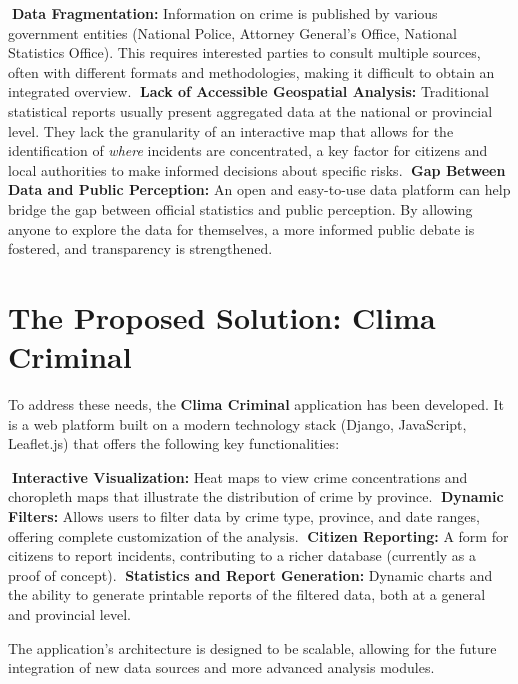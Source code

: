 \documentclass[12pt, a4paper]{article}
\begin{document}
\begin{enumerate}
    \textbf{Data Fragmentation:} Information on crime is published by various government entities (National Police, Attorney General's Office, National Statistics Office). This requires interested parties to consult multiple sources, often with different formats and methodologies, making it difficult to obtain an integrated overview.
    \textbf{Lack of Accessible Geospatial Analysis:} Traditional statistical reports usually present aggregated data at the national or provincial level. They lack the granularity of an interactive map that allows for the identification of \textit{where} incidents are concentrated, a key factor for citizens and local authorities to make informed decisions about specific risks.
    \textbf{Gap Between Data and Public Perception:} An open and easy-to-use data platform can help bridge the gap between official statistics and public perception. By allowing anyone to explore the data for themselves, a more informed public debate is fostered, and transparency is strengthened.
\end{enumerate}

\section{The Proposed Solution: Clima Criminal}

To address these needs, the \textbf{Clima Criminal} application has been developed. It is a web platform built on a modern technology stack (Django, JavaScript, Leaflet.js) that offers the following key functionalities:

\begin{itemize}
    \textbf{Interactive Visualization:} Heat maps to view crime concentrations and choropleth maps that illustrate the distribution of crime by province.
    \textbf{Dynamic Filters:} Allows users to filter data by crime type, province, and date ranges, offering complete customization of the analysis.
    \textbf{Citizen Reporting:} A form for citizens to report incidents, contributing to a richer database (currently as a proof of concept).
    \textbf{Statistics and Report Generation:} Dynamic charts and the ability to generate printable reports of the filtered data, both at a general and provincial level.
\end{itemize}

The application's architecture is designed to be scalable, allowing for the future integration of new data sources and more advanced analysis modules.
\end{document}
